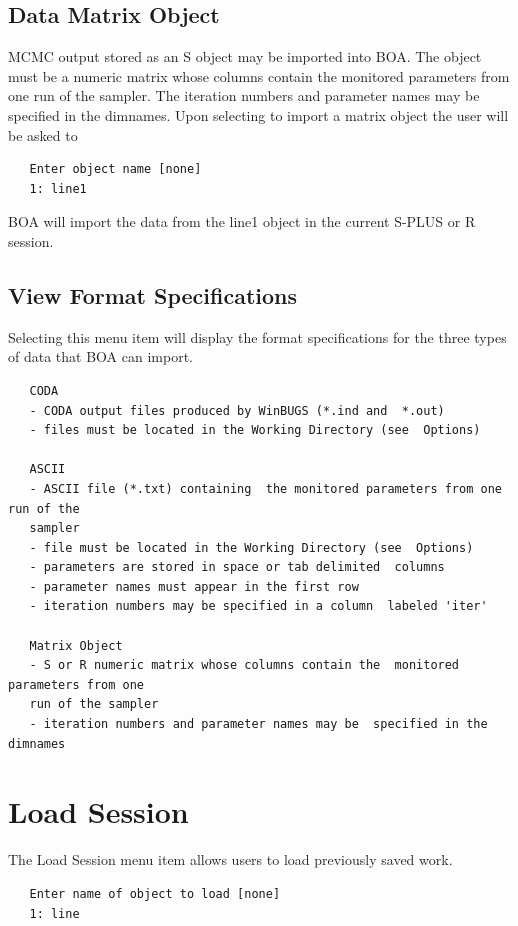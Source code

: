 \documentclass[12pt,letterpaper]{report}
\begin{document}
\subsection{Data Matrix Object}
\label{ssec.datamatrix}
\noindent MCMC output stored as an S
object may be imported into BOA. The object must be a numeric
matrix whose columns contain the monitored parameters from one run
of the sampler. The iteration numbers and parameter names may be
specified in the dimnames. Upon selecting to import a matrix
object the user will be asked to
\vskip 9pt
\begin{tiny}
\begin{verbatim}
   Enter object name [none]
   1: line1
\end{verbatim}
\end{tiny}
BOA will import the data from the line1 object in the current S-PLUS or R
session.

\subsection{View Format Specifications}
\noindent
Selecting this menu item will display the format specifications for the three
types of data that BOA can import.
\vskip 9pt
\begin{tiny}
\begin{verbatim}
   CODA
   - CODA output files produced by WinBUGS (*.ind and  *.out)
   - files must be located in the Working Directory (see  Options)

   ASCII
   - ASCII file (*.txt) containing  the monitored parameters from one run of the
   sampler
   - file must be located in the Working Directory (see  Options)
   - parameters are stored in space or tab delimited  columns
   - parameter names must appear in the first row
   - iteration numbers may be specified in a column  labeled 'iter'

   Matrix Object
   - S or R numeric matrix whose columns contain the  monitored parameters from one
   run of the sampler
   - iteration numbers and parameter names may be  specified in the dimnames
\end{verbatim}
\end{tiny}

\section{Load Session}
\noindent
The Load Session menu item allows users to load previously saved work.
\vskip 9pt
\begin{tiny}
\begin{verbatim}
   Enter name of object to load [none]
   1: line
\end{verbatim}
\end{tiny}
\end{document}
